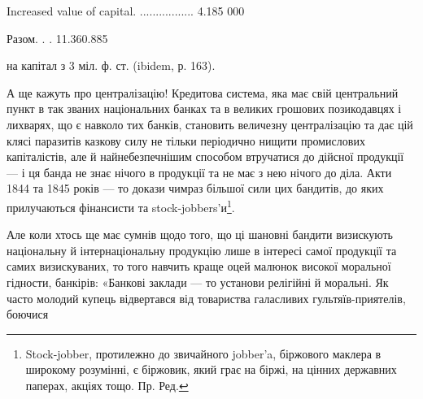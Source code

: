 Increased value of capital. ................. 4.185 000

Разом. . . 11.360.885

на капітал з 3 міл. ф. ст. (ibidem, р. 163).

А ще кажуть про централізацію! Кредитова система, яка має свій центральний
пункт в так званих національних банках та в великих грошових позикодавцях
і лихварях, що є навколо тих банків, становить величезну централізацію
та дає цій клясі паразитів казкову силу не тільки періодично нищити
промислових капіталістів, але й найнебезпечнішим способом втручатися до дійсної
продукції — і ця банда не знає нічого в продукції та не має з нею нічого до
діла. Акти 1844 та 1845 років — то докази чимраз більшої сили цих бандитів,
до яких прилучаються фінансисти та stock-jobbers’и\footnote*{
Stock-jobber, протилежно до звичайного jobber’a, біржового маклера в широкому розумінні, є
біржовик, який грає на біржі, на цінних державних паперах, акціях тощо. Пр. Ред.
}.

Але коли хтось ще має сумнів щодо того, що ці шановні бандити визискують
національну й інтернаціональну продукцію лише в інтересі самої продукції та самих
визискуваних, то того навчить краще оцей малюнок високої моральної гідности,
банкірів: «Банкові заклади — то установи релігійні й моральні. Як часто молодий
купець відвертався від товариства галасливих гультяїв-приятелів, боючися
